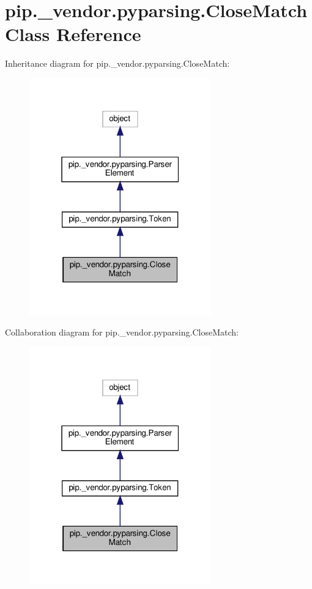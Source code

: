 \hypertarget{classpip_1_1__vendor_1_1pyparsing_1_1CloseMatch}{}\section{pip.\+\_\+vendor.\+pyparsing.\+Close\+Match Class Reference}
\label{classpip_1_1__vendor_1_1pyparsing_1_1CloseMatch}


Inheritance diagram for pip.\+\_\+vendor.\+pyparsing.\+Close\+Match\+:
\nopagebreak
\begin{figure}[H]
\begin{center}
\leavevmode
\includegraphics[width=223pt]{classpip_1_1__vendor_1_1pyparsing_1_1CloseMatch__inherit__graph}
\end{center}
\end{figure}


Collaboration diagram for pip.\+\_\+vendor.\+pyparsing.\+Close\+Match\+:
\nopagebreak
\begin{figure}[H]
\begin{center}
\leavevmode
\includegraphics[width=223pt]{classpip_1_1__vendor_1_1pyparsing_1_1CloseMatch__coll__graph}
\end{center}
\end{figure}
